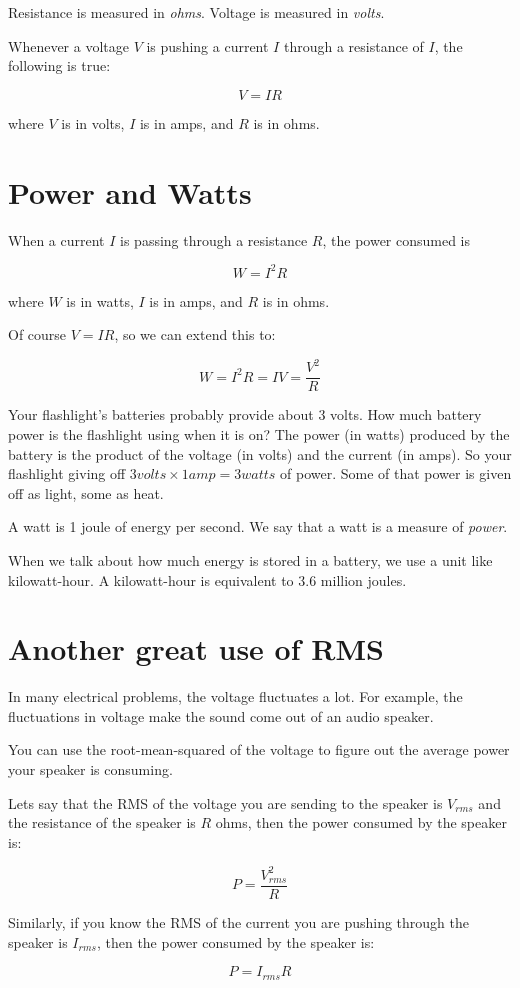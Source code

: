 Resistance is measured in \textit{ohms}.  Voltage is measured in
\textit{volts}.

\begin{mdframed}[style=important, frametitle={Ohm's Law}]
  Whenever a voltage $V$ is pushing a current $I$ through a resistance of $I$, the following is true:

  $$V = IR$$

  where $V$ is in volts, $I$ is in amps, and $R$ is in ohms.
\end{mdframed}

\section{Power and Watts}

\begin{mdframed}[style=important, frametitle={Joule's Law}]

  When a current $I$ is passing through a resistance $R$, the power consumed is
  
  $$W = I^2 R$$

  where $W$ is in watts, $I$ is in amps, and $R$ is in ohms.
\end{mdframed}

Of course $V = IR$, so we can extend this to:

$$W = I^2 R = I V = \frac{V^2}{R}$$

Your flashlight's batteries probably provide about 3 volts.  How much
battery power is the flashlight using when it is on? The power (in
watts) produced by the battery is the product of the voltage (in
volts) and the current (in amps). So your flashlight giving off $3
volts \times 1 amp = 3 watts$ of power. Some of that power is given
off as light, some as heat.

A watt is 1 joule of energy per second. We say that a watt is a
measure of \textit{power}.

When we talk about how much energy is stored in a battery, we use a
unit like kilowatt-hour.  A kilowatt-hour is equivalent to 3.6 million
joules.

\section{Another great use of RMS}

In many electrical problems, the voltage fluctuates a lot.  For
example, the fluctuations in voltage make the sound come out of an
audio speaker.

You can use the root-mean-squared of the voltage to figure out the average power
your speaker is consuming.

Lets say that the RMS of the voltage you are sending to the speaker is $V_{rms}$
and the resistance of the speaker is $R$ ohms, then the power consumed
by the speaker is:

$$P = \frac{V_{rms}^2}{R}$$

Similarly, if you know the RMS of the current you are pushing through
the speaker is $I_{rms}$, then the power consumed by the speaker is:

$$P = I_{rms} R$$

